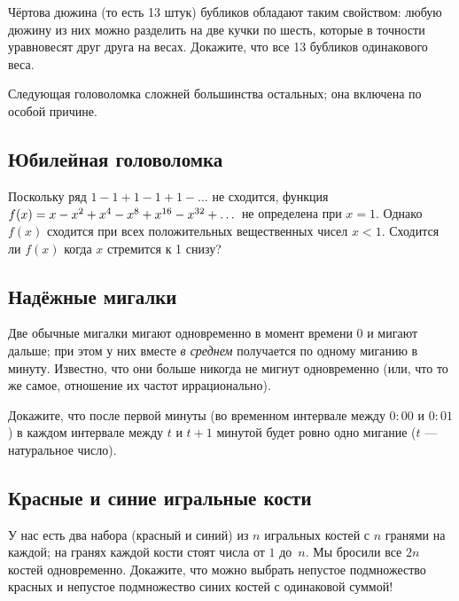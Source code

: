 Чёртова дюжина (то есть 13 штук) бубликов обладают таким свойством: любую дюжину из них можно разделить на две кучки по шесть, которые в точности уравновесят друг друга на весах.
Докажите, что все 13 бубликов одинакового веса.

\medskip

Следующая головоломка сложней большинства остальных;
она включена по особой причине.

\subsection*{Юбилейная головоломка}

Поскольку ряд $1 - 1 + 1 - 1 + 1 - \dots$ не сходится,  функция 
$f(x)\z=x-x^2+x^4-x^8+x^{16}-x^{32}+\dots$ не определена при $x=1$.
Однако $f(x)$ сходится при всех положительных вещественных чисел $x<1$.
Сходится ли $f(x)$ когда $x$ стремится к 1 снизу?

\subsection*{Надёжные мигалки}

Две обычные мигалки мигают одновременно в момент времени $0$
и мигают дальше; при этом у них вместе \emph{в среднем} получается по одному миганию в минуту.
Известно, что они больше никогда не мигнут одновременно (или, что то же самое, отношение их частот иррационально).

Докажите, что после первой минуты (во временном интервале между $0{:}00$ и $0{:}01$) в каждом интервале между $t$ и $t + 1$ минутой будет ровно одно мигание ($t$ --- натуральное число).

\subsection*{Красные и синие игральные кости}

У нас есть два набора (красный и синий) из $n$ игральных костей с $n$ гранями на каждой;
на гранях каждой кости стоят числа от $1$ до~$n$.
Мы бросили все $2n$ костей одновременно.
Докажите, что можно выбрать непустое подмножество красных и непустое подмножество синих костей с одинаковой суммой!
